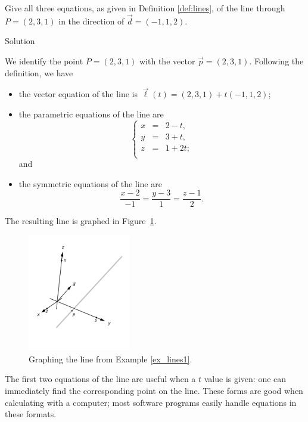\begin{example}\label{ex_lines1}
Give all three equations, as given in Definition \ref{def:lines}, of the line through $P = (2,3,1)$ in the direction of $\vec d = ( -1,1,2)$.

Solution 

We identify the point $P=(2,3,1)$ with the vector $\vec p =( 2,3,1)$. Following the definition, we have
\begin{itemize}
	\item the vector equation of the line is $\vec\ell(t) = ( 2,3,1) + t( -1,1,2)$;
	\item	the parametric equations of the line are
		$$
\left\{
\begin{array}{lcl}
x &=& 2-t,\\
y&=&3+t, \\
z &=& 1+2t;\\
\end{array}
\right.
$$
and
	\item	the symmetric equations of the line are
	$$\frac{x-2}{-1}=\frac{y-3}{1} = \frac{z-1}{2}.$$
\end{itemize}

The resulting line is graphed in Figure~\ref{fig_ana_geo_2}.

\begin{figure}[H]
	\begin{center}
			\includegraphics[width=0.4\textwidth]{fig_ana_geo_2}
	\caption{Graphing the line from Example \ref{ex_lines1}.}
	\label{fig_ana_geo_2}
	\end{center}
\end{figure}


The first two equations of the line are useful when a $t$ value is given: one can immediately find the corresponding point on the line. These forms are good when calculating with a computer; most software programs easily handle equations in these formats. 
\end{example}

